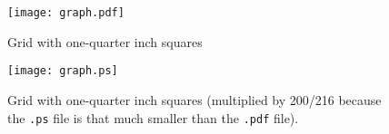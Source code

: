 \documentclass{article}
\begin{document}
\begin{figure}
\texttt{[image: graph.pdf]}
\caption{Grid with one-quarter inch squares}
\end{figure}

\begin{figure}
\texttt{[image: graph.ps]}
\caption{Grid with one-quarter inch squares (multiplied by 200/216
because the \texttt{.ps} file is that much smaller than the \texttt{.pdf}
file).}
\end{figure}
\end{document}
